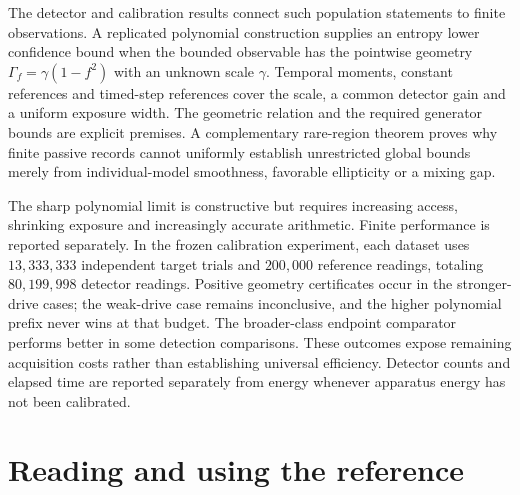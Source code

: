 \documentclass[11pt,oneside]{book}
\theoremstyle{definition}
\theoremstyle{remark}
\begin{document}
The detector and calibration results connect such population statements to
finite observations. A replicated polynomial construction supplies an entropy
lower confidence bound when the bounded observable has the pointwise geometry
$\Gamma_f=\gamma(1-f^2)$ with an unknown scale $\gamma$. Temporal moments,
constant references and timed-step references cover the scale, a common
detector gain and a uniform exposure width. The geometric relation and the
required generator bounds are explicit premises. A complementary rare-region
theorem proves why finite passive records cannot uniformly establish
unrestricted global bounds merely from individual-model smoothness, favorable
ellipticity or a mixing gap.

The sharp polynomial limit is constructive but requires increasing access,
shrinking exposure and increasingly accurate arithmetic. Finite performance
is reported separately. In the frozen calibration experiment, each dataset
uses $13{,}333{,}333$ independent target trials and $200{,}000$ reference
readings, totaling $80{,}199{,}998$ detector readings. Positive geometry
certificates occur in the stronger-drive cases; the weak-drive case remains
inconclusive, and the higher polynomial prefix never wins at that budget.
The broader-class endpoint comparator performs better in some detection
comparisons. These outcomes expose remaining acquisition costs rather than
establishing universal efficiency. Detector counts and elapsed time are
reported separately from energy whenever apparatus energy has not been
calibrated.

\section*{Reading and using the reference}
\end{document}
